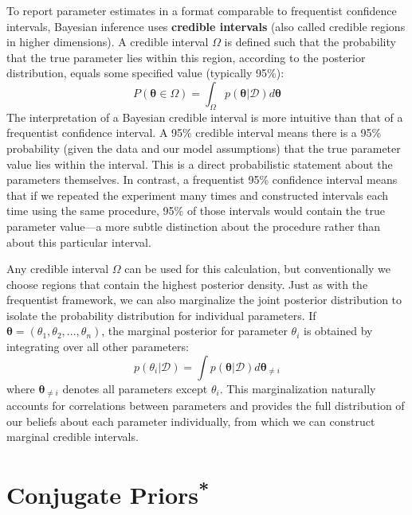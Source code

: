 To report parameter estimates in a format comparable to frequentist confidence intervals, Bayesian inference uses \textbf{credible intervals} (also called credible regions in higher dimensions). A credible interval $\Omega$ is defined such that the probability that the true parameter lies within this region, according to the posterior distribution, equals some specified value (typically 95\%):
\begin{equation}
    P(\boldsymbol{\theta} \in \Omega) = \int_{\Omega} p(\boldsymbol{\theta}|\mathcal{D})d\boldsymbol{\theta}
\end{equation}
The interpretation of a Bayesian credible interval is more intuitive than that of a frequentist confidence interval. A 95\% credible interval means there is a 95\% probability (given the data and our model assumptions) that the true parameter value lies within the interval. This is a direct probabilistic statement about the parameters themselves. In contrast, a frequentist 95\% confidence interval means that if we repeated the experiment many times and constructed intervals each time using the same procedure, 95\% of those intervals would contain the true parameter value---a more subtle distinction about the procedure rather than about this particular interval.

Any credible interval $\Omega$ can be used for this calculation, but conventionally we choose regions that contain the highest posterior density. Just as with the frequentist framework, we can also marginalize the joint posterior distribution to isolate the probability distribution for individual parameters. If $\boldsymbol{\theta} = (\theta_1, \theta_2, \ldots, \theta_n)$, the marginal posterior for parameter $\theta_i$ is obtained by integrating over all other parameters:
\begin{equation}
    p(\theta_i|\mathcal{D}) = \int p(\boldsymbol{\theta}|\mathcal{D})d\boldsymbol{\theta}_{\neq i}
\end{equation}
where $\boldsymbol{\theta}_{\neq i}$ denotes all parameters except $\theta_i$. This marginalization naturally accounts for correlations between parameters and provides the full distribution of our beliefs about each parameter individually, from which we can construct marginal credible intervals.

\section{\texorpdfstring{Conjugate Priors\textsuperscript{*}}{Conjugate Priors}}

